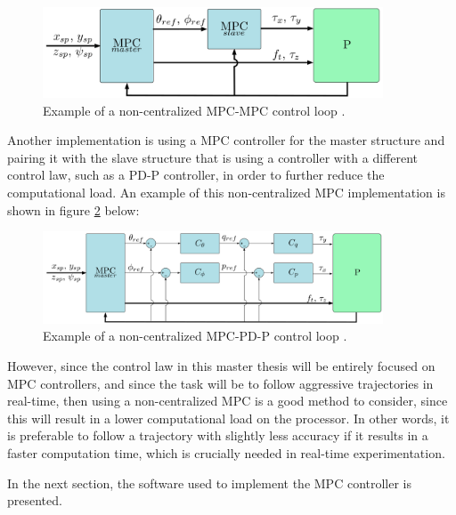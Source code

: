 \documentclass{thesisreport}
\begin{document}
\begin{figure}[h]
	\centering
	\includegraphics[width=0.9\textwidth]{Images/Control/MPC/non-centralized_mpc_1.png}
	\caption{Example of a non-centralized MPC-MPC control loop \cite{Alvarez-Valle2019}.}
	\label{fig:non_centralized_mpc_1}
\end{figure}

Another implementation is using a MPC controller for the master structure and pairing it with the slave structure that is using a controller with a different control law, such as a PD-P controller, in order to further reduce the computational load. An example of this non-centralized MPC implementation is shown in figure \ref{fig:non_centralized_mpc_2} below:

\begin{figure}[h]
	\centering
	\includegraphics[width=0.9\textwidth]{Images/Control/MPC/non-centralized_mpc_2.png}
	\caption{Example of a non-centralized MPC-PD-P control loop \cite{Alvarez-Valle2019}.}
	\label{fig:non_centralized_mpc_2}
\end{figure}

However, since the control law in this master thesis will be entirely focused on MPC controllers, and since the task will be to follow aggressive trajectories in real-time, then using a non-centralized MPC is a good method to consider, since this will result in a lower computational load on the processor. In other words, it is preferable to follow a trajectory with slightly less accuracy if it results in a faster computation time, which is crucially needed in real-time experimentation.

In the next section, the software used to implement the MPC controller is presented.

 \newpage  
	 
\end{document}
